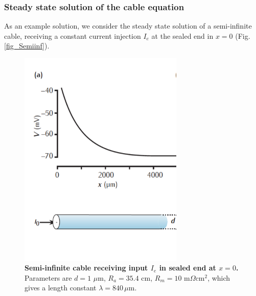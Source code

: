 \subsubsection{Steady state solution of the cable equation}
As an example solution, we consider the steady state solution of a semi-infinite cable, receiving a constant current injection $I_e$ at the sealed end in $x=0$ (Fig. \ref{fig_Semiinf}).

\begin{figure}[!ht]
\begin{center}
\includegraphics[width=0.7\textwidth]{Fig02/Semiinf.png}
\end{center}
\caption{\textbf{Semi-infinite cable receiving input $I_e$ in sealed end at $x=0$.} Parameters are $d = 1$ $\mu$m, $R_a=35.4$ cm, $R_m = 10$ m$\Omega$cm$^2$, which gives a length constant $\lambda = 840\, \mu$m. }
\label{fig:Semiinf}
\end{figure}

